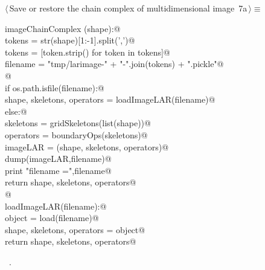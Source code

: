 \documentclass[11pt,oneside]{article}	%
\begin{document}
\begin{flushleft} \small
\begin{minipage}{\linewidth} \label{scrap10}
\protect{}$\langle\,$Save or restore the chain complex of multidimensional image\nobreak\ {\footnotesize 7a}$\,\rangle\equiv$
\vspace{-1ex}
\begin{list}{}{} \item
\mbox{}\verb@def imageChainComplex (shape):@\\
\mbox{}\verb@   tokens = str(shape)[1:-1].split(',')@\\
\mbox{}\verb@   tokens = [token.strip() for token in tokens]@\\
\mbox{}\verb@   filename = "tmp/larimage-" + "-".join(tokens) + ".pickle"@\\
\mbox{}\verb@   @\\
\mbox{}\verb@   if os.path.isfile(filename):@\\
\mbox{}\verb@      shape, skeletons, operators = loadImageLAR(filename)@\\
\mbox{}\verb@   else:@\\
\mbox{}\verb@      skeletons = gridSkeletons(list(shape))@\\
\mbox{}\verb@      operators = boundaryOps(skeletons)@\\
\mbox{}\verb@      imageLAR = (shape, skeletons, operators)@\\
\mbox{}\verb@      dump(imageLAR,filename)@\\
\mbox{}\verb@      print "filename =",filename@\\
\mbox{}\verb@   return shape, skeletons, operators@\\
\mbox{}\verb@   @\\
\mbox{}\verb@def loadImageLAR(filename):@\\
\mbox{}\verb@   object = load(filename)@\\
\mbox{}\verb@   shape, skeletons, operators = object@\\
\mbox{}\verb@   return shape, skeletons, operators@\\
\mbox{}\verb@@{\NWsep}
\end{list}
\vspace{-1ex}
\footnotesize\addtolength{\baselineskip}{-1ex}
\begin{list}{}{\setlength{\itemsep}{-\parsep}\setlength{\itemindent}{-\leftmargin}}
\item \NWtxtMacroRefIn\ .
\end{list}
\end{minipage}\\[4ex]
\end{flushleft}
	
\end{document}
